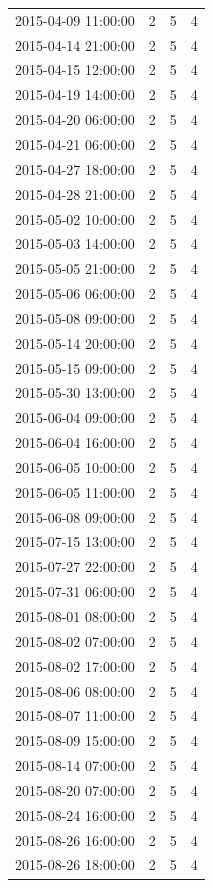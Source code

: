 \begin{tabular}{lrrr}
2015-04-09 11:00:00 & 2 & 5 & 4 \\
2015-04-14 21:00:00 & 2 & 5 & 4 \\
2015-04-15 12:00:00 & 2 & 5 & 4 \\
2015-04-19 14:00:00 & 2 & 5 & 4 \\
2015-04-20 06:00:00 & 2 & 5 & 4 \\
2015-04-21 06:00:00 & 2 & 5 & 4 \\
2015-04-27 18:00:00 & 2 & 5 & 4 \\
2015-04-28 21:00:00 & 2 & 5 & 4 \\
2015-05-02 10:00:00 & 2 & 5 & 4 \\
2015-05-03 14:00:00 & 2 & 5 & 4 \\
2015-05-05 21:00:00 & 2 & 5 & 4 \\
2015-05-06 06:00:00 & 2 & 5 & 4 \\
2015-05-08 09:00:00 & 2 & 5 & 4 \\
2015-05-14 20:00:00 & 2 & 5 & 4 \\
2015-05-15 09:00:00 & 2 & 5 & 4 \\
2015-05-30 13:00:00 & 2 & 5 & 4 \\
2015-06-04 09:00:00 & 2 & 5 & 4 \\
2015-06-04 16:00:00 & 2 & 5 & 4 \\
2015-06-05 10:00:00 & 2 & 5 & 4 \\
2015-06-05 11:00:00 & 2 & 5 & 4 \\
2015-06-08 09:00:00 & 2 & 5 & 4 \\
2015-07-15 13:00:00 & 2 & 5 & 4 \\
2015-07-27 22:00:00 & 2 & 5 & 4 \\
2015-07-31 06:00:00 & 2 & 5 & 4 \\
2015-08-01 08:00:00 & 2 & 5 & 4 \\
2015-08-02 07:00:00 & 2 & 5 & 4 \\
2015-08-02 17:00:00 & 2 & 5 & 4 \\
2015-08-06 08:00:00 & 2 & 5 & 4 \\
2015-08-07 11:00:00 & 2 & 5 & 4 \\
2015-08-09 15:00:00 & 2 & 5 & 4 \\
2015-08-14 07:00:00 & 2 & 5 & 4 \\
2015-08-20 07:00:00 & 2 & 5 & 4 \\
2015-08-24 16:00:00 & 2 & 5 & 4 \\
2015-08-26 16:00:00 & 2 & 5 & 4 \\
2015-08-26 18:00:00 & 2 & 5 & 4 \\

\end{tabular}

